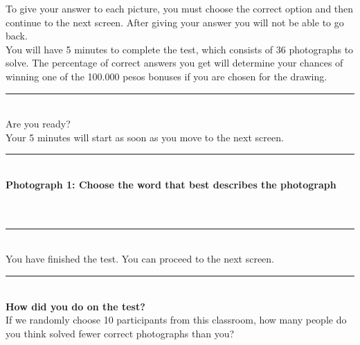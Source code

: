 \documentclass[11pt,a4paper,oneside]{article}
\begin{document}
\noindent To give your answer to each picture, you must choose the correct option and then continue to the next screen. After giving your answer you will not be able to go back. \\

\noindent You will have 5 minutes to complete the test, which consists of 36 photographs to solve. The percentage of correct answers you get will determine your chances of winning one of the 100.000 pesos bonuses if you are chosen for the drawing. \\

\noindent\rule{\textwidth}{0.4pt}\\

\noindent Are you ready? \\
 
\noindent Your 5 minutes will start as soon as you move to the next screen. \\

\noindent\rule{\textwidth}{0.4pt}\\

\noindent \textbf{Photograph 1: Choose the word that best describes the photograph} \\

 \\

 \\

\noindent\rule{\textwidth}{0.4pt}\\

\noindent You have finished the test. You can proceed to the next screen. \\

\noindent\rule{\textwidth}{0.4pt}\\

\noindent \textbf{How did you do on the test?} \\

\noindent If we randomly choose 10 participants from this classroom, how many people do you think solved fewer correct photographs than you?\\

\\
\end{document}
